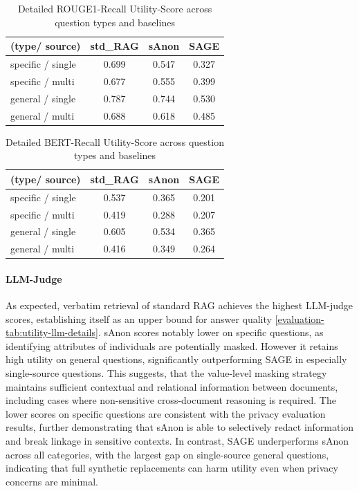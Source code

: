 \begin{table}[h!]
\centering
\caption{Detailed ROUGE1-Recall Utility-Score across question types and baselines}
\label{evaluation-tab:utility-rouge-details}
\begin{tabular}{l c c c}
\toprule
\textbf{(type/ source)} & \textbf{std\_RAG} & \textbf{sAnon} & \textbf{SAGE} \\
\midrule
specific / single & 0.699 & 0.547 & 0.327 \\
specific / multi & 0.677 & 0.555 & 0.399 \\
general / single & 0.787 & 0.744 & 0.530 \\
general / multi & 0.688 & 0.618 & 0.485 \\
\bottomrule
\end{tabular}
\end{table}


\begin{table}[h!]
\centering
\caption{Detailed BERT-Recall Utility-Score across question types and baselines}
\label{evaluation-tab:utility-bert-details}
\begin{tabular}{l c c c}
\toprule
\textbf{(type/ source)} & \textbf{std\_RAG} & \textbf{sAnon} & \textbf{SAGE} \\
\midrule
specific / single & 0.537 & 0.365 & 0.201 \\
specific / multi & 0.419 & 0.288 & 0.207 \\
general / single & 0.605 & 0.534 & 0.365 \\
general / multi & 0.416 & 0.349 & 0.264 \\
\bottomrule
\end{tabular}
\end{table}



\paragraph{LLM-Judge}
As expected, verbatim retrieval of standard RAG achieves the highest LLM-judge scores, establishing itself as an upper bound for answer quality \ref{evaluation-tab:utility-llm-details}. sAnon scores notably lower on specific questions, as identifying attributes of individuals are potentially masked.
However it retains high utility on general questions, significantly outperforming SAGE in especially single-source questions.
This suggests, that the value-level masking strategy maintains sufficient contextual and relational information between documents, including cases where non-sensitive cross-document reasoning is required. The lower scores on specific questions are consistent with the privacy evaluation results, further demonstrating that sAnon is able to selectively redact information and break linkage in sensitive contexts.
In contrast, SAGE underperforms sAnon across all categories, with the largest gap on single-source general questions, indicating that full synthetic replacements can harm utility even when privacy concerns are minimal.

